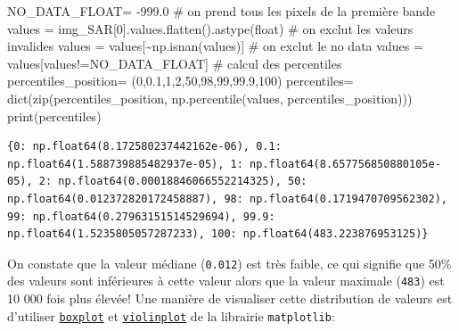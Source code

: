 \documentclass[
  11pt,
  letterpaper,
  open=any,
  twoside=false,
  french]{scrbook}
\newenvironment{Shaded}{\begin{snugshade}}{\end{snugshade}}
\newcommand{\BuiltInTok}[1]{\textcolor[rgb]{0.00,0.23,0.31}{#1}}
\newcommand{\CommentTok}[1]{\textcolor[rgb]{0.37,0.37,0.37}{#1}}
\newcommand{\DecValTok}[1]{\textcolor[rgb]{0.68,0.00,0.00}{#1}}
\newcommand{\FloatTok}[1]{\textcolor[rgb]{0.68,0.00,0.00}{#1}}
\newcommand{\NormalTok}[1]{\textcolor[rgb]{0.00,0.23,0.31}{#1}}
\newcommand{\OperatorTok}[1]{\textcolor[rgb]{0.37,0.37,0.37}{#1}}
\begin{document}
\begin{Shaded}
\begin{Highlighting}[]
\NormalTok{NO\_DATA\_FLOAT}\OperatorTok{=} \OperatorTok{{-}}\FloatTok{999.0}
\CommentTok{\# on prend tous les pixels de la première bande}
\NormalTok{values }\OperatorTok{=}\NormalTok{ img\_SAR[}\DecValTok{0}\NormalTok{].values.flatten().astype(}\BuiltInTok{float}\NormalTok{)}
\CommentTok{\# on exclut les valeurs invalides}
\NormalTok{values }\OperatorTok{=}\NormalTok{ values[}\OperatorTok{\textasciitilde{}}\NormalTok{np.isnan(values)]}
\CommentTok{\# on exclut le no data}
\NormalTok{values }\OperatorTok{=}\NormalTok{ values[values}\OperatorTok{!=}\NormalTok{NO\_DATA\_FLOAT]}
\CommentTok{\# calcul des percentiles}
\NormalTok{percentiles\_position}\OperatorTok{=}\NormalTok{ (}\DecValTok{0}\NormalTok{,}\FloatTok{0.1}\NormalTok{,}\DecValTok{1}\NormalTok{,}\DecValTok{2}\NormalTok{,}\DecValTok{50}\NormalTok{,}\DecValTok{98}\NormalTok{,}\DecValTok{99}\NormalTok{,}\FloatTok{99.9}\NormalTok{,}\DecValTok{100}\NormalTok{)}
\NormalTok{percentiles}\OperatorTok{=} \BuiltInTok{dict}\NormalTok{(}\BuiltInTok{zip}\NormalTok{(percentiles\_position, np.percentile(values, percentiles\_position)))}
\BuiltInTok{print}\NormalTok{(percentiles)}
\end{Highlighting}
\end{Shaded}

\begin{verbatim}
{0: np.float64(8.172580237442162e-06), 0.1: np.float64(1.588739885482937e-05), 1: np.float64(8.657756850880105e-05), 2: np.float64(0.00018846066552214325), 50: np.float64(0.012372820172458887), 98: np.float64(0.1719470709562302), 99: np.float64(0.27963151514529694), 99.9: np.float64(1.5235805057287233), 100: np.float64(483.223876953125)}
\end{verbatim}

On constate que la valeur médiane (\texttt{0.012}) est très faible, ce
qui signifie que 50\% des valeurs sont inférieures à cette valeur alors
que la valeur maximale (\texttt{483}) est 10 000 fois plus élevée! Une
manière de visualiser cette distribution de valeurs est d'utiliser
\href{https://matplotlib.org/stable/api/_as_gen/matplotlib.pyplot.boxplot.html}{\texttt{boxplot}}
et
\href{https://matplotlib.org/stable/api/_as_gen/matplotlib.pyplot.violinplot.html}{\texttt{violinplot}}
de la librairie \texttt{matplotlib}:
\end{document}

